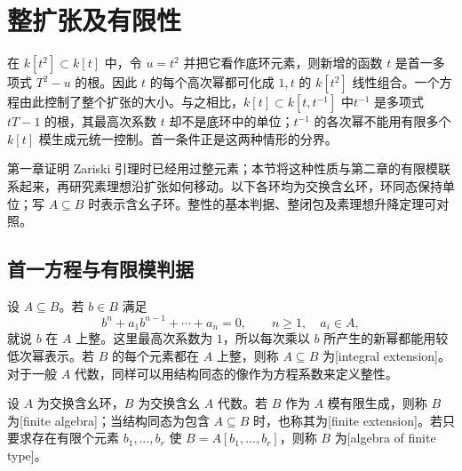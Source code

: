 
% 
% 

\section{整扩张及有限性}
\label{g5:sec:0301}

在 \(k[t^2]\subset k[t]\) 中，令 \(u=t^2\) 并把它看作底环元素，则新增的函数 \(t\) 是首一多项式 \(T^2-u\) 的根。因此 \(t\) 的每个高次幂都可化成 \(1,t\) 的 \(k[t^2]\) 线性组合。一个方程由此控制了整个扩张的大小。与之相比，\(k[t]\subset k[t,t^{-1}]\) 中\(t^{-1}\) 是多项式 \(tT-1\) 的根，其最高次系数 \(t\) 却不是底环中的单位；\(t^{-1}\) 的各次幂不能用有限多个 \(k[t]\) 模生成元统一控制。首一条件正是这两种情形的分界。

\ProseParagraphBreak

第一章证明 Zariski 引理时已经用过整元素；本节将这种性质与第二章的有限模联系起来，再研究素理想沿扩张如何移动。以下各环均为交换含幺环，环同态保持单位；写 \(A\subseteq B\) 时表示含幺子环。整性的基本判据、整闭包及素理想升降定理可对照\cite[第9节，第64--68页]{Matsumura1989}。

\subsection{首一方程与有限模判据}
\label{g5:subsec:0301:01}

设 \(A\subseteq B\)。若 \(b\in B\) 满足
\[
	b^n+a_1b^{n-1}+\cdots+a_n=0,
	\qquad n\geq1,\quad a_i\in A,
\]
就说 \(b\) 在 \(A\) 上整。这里最高次系数为 \(1\)，所以每次乘以 \(b\) 所产生的新幂都能用较低次幂表示。若 \(B\) 的每个元素都在 \(A\) 上整，则称 \(A\subseteq B\) 为[integral extension]。对于一般 \(A\) 代数，同样可以用结构同态的像作为方程系数来定义整性。

\begin{definition}
\label{g5:def:finite-algebra}
	设 \(A\) 为交换含幺环，\(B\) 为交换含幺 \(A\) 代数。若 \(B\) 作为 \(A\) 模有限生成，则称 \(B\) 为[finite algebra]；当结构同态为包含 \(A\subseteq B\) 时，也称其为[finite extension]。若只要求存在有限个元素 \(b_1,\ldots,b_r\) 使 \(B=A[b_1,\ldots,b_r]\)，则称 \(B\) 为[algebra of finite type]。
\end{definition}

